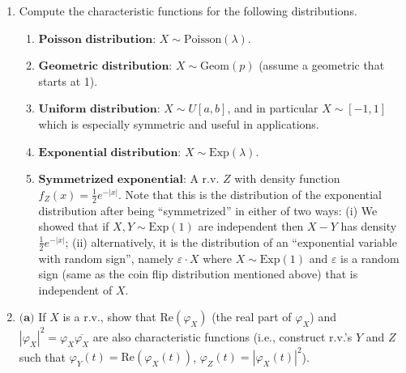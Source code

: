 \documentclass[11pt]{report}
\newcommand{\R}{\mathbb{R}}
\theoremstyle{plain}
\theoremstyle{definition}
\begin{document}
\begin{enumerate}[label=\arabic*.]
\[
\mathbf{X}_n = (X_{n,1},\ldots,X_{n,n}) = \frac{1}{\left(\sum_{i=1}^n Z_i^2\right)^{1/2}}
(Z_1,\ldots,Z_n)
\]

(a) The distribution of the random vector $\mathbf{X}_n$ is called the \emph{uniform distribution on the $(n-1)$-dimensional sphere $S^{n-1}=\{ x\in \R^n\,:\, ||x||=1 \}$}. Explain why this makes intuitive sense, and if possible explain rigorously what conditions this distribution satisfies that justifies describing it by this name.

(b) Show that $\sqrt{n} X_{n,1} \implies N(0,1)$ as $n\to\infty$.

$\textbf{Hint.}$ Use the law of large numbers.

(c) For each $n\ge 1$, find the density function of the coordinate $X_{n,1}$. Optionally, use this to give an alternative solution to part (b) above.

$\textbf{Hint.}$ Do it first for $n=2$ and $n=3$, and generalize using ideas from multivariate calculus. For $n=3$, you should find that $X_{3,1} \sim U[-1,1]$, a geometric fact which was known to Archimedes.
\item Compute the characteristic functions for the following distributions.

\begin{enumerate}[label=(\alph*)]
\item $\textbf{Poisson distribution:}$ $X\sim \textrm{Poisson}(\lambda)$.
\item $\textbf{Geometric distribution:}$ $X\sim \textrm{Geom}(p)$ (assume a geometric that starts at 1).
\item $\textbf{Uniform distribution:}$ $X \sim U[a,b]$, and in particular $X\sim [-1,1]$ which is especially symmetric and useful in applications.
\item $\textbf{Exponential distribution:}$ $X\sim \textrm{Exp}(\lambda)$.
\item $\textbf{Symmetrized exponential:}$ A r.v. $Z$ with density function $f_Z(x) = \frac12 e^{-|x|}$. Note that this is the distribution of the exponential distribution after being ``symmetrized'' in either of two ways: (i) We showed that if $X,Y\sim \textrm{Exp}(1)$ are independent then $X-Y$ has density $\frac12 e^{-|x|}$; (ii) alternatively, it is the distribution of an ``exponential variable with random sign'', namely $\varepsilon\cdot X$ where $X\sim \textrm{Exp}(1)$ and $\varepsilon$ is a random sign (same as the coin flip distribution mentioned above) that is independent of $X$.
\end{enumerate}
\item $\textbf{(a)}$ If $X$ is a r.v., show that $\textrm{Re}(\varphi_X)$ (the real part of $\varphi_X$) and $|\varphi_X|^2 = \varphi_X \overline{\varphi_X}$ are also characteristic functions (i.e., construct r.v.'s $Y$ and $Z$ such that
$\varphi_Y(t) = \textrm{Re}(\varphi_X(t))$, $\varphi_Z(t) = |\varphi_X(t)|^2$).


\end{enumerate}
\end{document}
